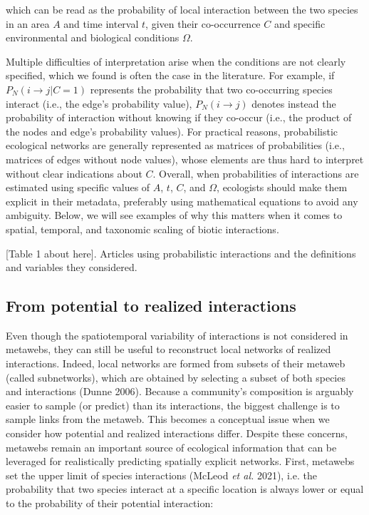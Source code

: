 \documentclass[10pt,oneside]{article}
\begin{document}
which can be read as the probability of local interaction between the
two species in an area \(A\) and time interval \(t\), given their
co-occurrence \(C\) and specific environmental and biological conditions
\(\Omega\).

Multiple difficulties of interpretation arise when the conditions are
not clearly specified, which we found is often the case in the
literature. For example, if \(P_{N}(i \rightarrow j | C = 1)\)
represents the probability that two co-occurring species interact (i.e.,
the edge's probability value), \(P_{N}(i \rightarrow j)\) denotes
instead the probability of interaction without knowing if they co-occur
(i.e., the product of the nodes and edge's probability values). For
practical reasons, probabilistic ecological networks are generally
represented as matrices of probabilities (i.e., matrices of edges
without node values), whose elements are thus hard to interpret without
clear indications about \(C\). Overall, when probabilities of
interactions are estimated using specific values of \(A\), \(t\), \(C\),
and \(\Omega\), ecologists should make them explicit in their metadata,
preferably using mathematical equations to avoid any ambiguity. Below,
we will see examples of why this matters when it comes to spatial,
temporal, and taxonomic scaling of biotic interactions.

{[}Table 1 about here{]}. Articles using probabilistic interactions and
the definitions and variables they considered.

\hypertarget{from-potential-to-realized-interactions}{%
\subsection{From potential to realized
interactions}\label{from-potential-to-realized-interactions}}

Even though the spatiotemporal variability of interactions is not
considered in metawebs, they can still be useful to reconstruct local
networks of realized interactions. Indeed, local networks are formed
from subsets of their metaweb (called subnetworks), which are obtained
by selecting a subset of both species and interactions (Dunne 2006).
Because a community's composition is arguably easier to sample (or
predict) than its interactions, the biggest challenge is to sample links
from the metaweb. This becomes a conceptual issue when we consider how
potential and realized interactions differ. Despite these concerns,
metawebs remain an important source of ecological information that can
be leveraged for realistically predicting spatially explicit networks.
First, metawebs set the upper limit of species interactions (McLeod
\emph{et al.} 2021), i.e. the probability that two species interact at a
specific location is always lower or equal to the probability of their
potential interaction:
\end{document}
